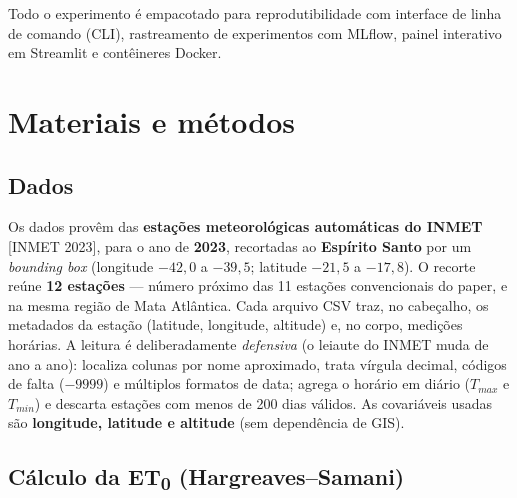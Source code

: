 Todo o experimento é empacotado para reprodutibilidade com interface de linha de
comando (CLI), rastreamento de experimentos com MLflow, painel interativo em
Streamlit e contêineres Docker.

\section{Materiais e métodos}

\subsection{Dados}

Os dados provêm das \textbf{estações meteorológicas automáticas do INMET}
[INMET 2023], para o ano de \textbf{2023}, recortadas ao \textbf{Espírito Santo}
por um \emph{bounding box} (longitude $-42{,}0$ a $-39{,}5$; latitude $-21{,}5$ a
$-17{,}8$). O recorte reúne \textbf{12 estações} --- número próximo das 11 estações
convencionais do paper, e na mesma região de Mata Atlântica. Cada arquivo CSV traz,
no cabeçalho, os metadados da estação (latitude, longitude, altitude) e, no corpo,
medições horárias. A leitura é deliberadamente \emph{defensiva} (o leiaute do INMET
muda de ano a ano): localiza colunas por nome aproximado, trata vírgula decimal,
códigos de falta ($-9999$) e múltiplos formatos de data; agrega o horário em diário
($T_{max}$ e $T_{min}$) e descarta estações com menos de 200 dias válidos. As
covariáveis usadas são \textbf{longitude, latitude e altitude} (sem dependência de
GIS).

\subsection{Cálculo da ET\textsubscript{0} (Hargreaves--Samani)}

